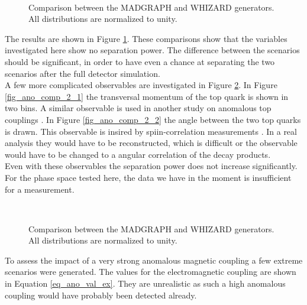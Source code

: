 \begin{figure}
  \\
  \caption{Comparison between the MADGRAPH and WHIZARD generators. All distributions are normalized to unity. }
  \label{fig_ano_comp_1}
\end{figure}

The results are shown in Figure \ref{fig_ano_comp_1}. These comparisons show that the variables investigated here show no separation power.  The difference between the scenarios should be significant, in order to have even a chance at separating the two scenarios after the full detector simulation.\\
A few more complicated observables are investigated in Figure \ref{fig_ano_comp_2}. In Figure \ref{fig_ano_comp_2_1} the transversal momentum of the top quark is shown in two bins. A similar observable is used in another study on anomalous top couplings . In Figure \ref{fig_ano_comp_2_2} the angle between the two top quarks is drawn. This observable is insired by spiin-correlation measurements . In a real analysis they would have to be reconstructed, which is difficult or the observable would have to be changed to a angular correlation of the decay products.\\
Even with these observables the separation power does not increase significantly. For the phase space tested here, the data we have in the moment is insufficient for a measurement.   

\begin{figure}
  \\
  \caption{Comparison between the MADGRAPH and WHIZARD generators. All distributions are normalized to unity. }
  \label{fig_ano_comp_2}
\end{figure}

To assess the impact of a very strong anomalous magnetic coupling a few extreme scenarios were generated. The values for the electromagnetic coupling are shown in Equation \ref{eq_ano_val_ex}. They are unrealistic as such a high anomalous coupling would have probably been detected already.


